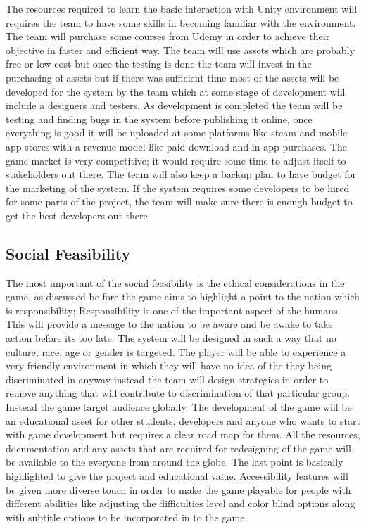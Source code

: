 The resources required to learn the basic interaction with Unity environment will requires the team to have some skills in becoming familiar with the environment. The team will purchase some courses from Udemy in order to achieve their objective in faster and efficient way.
The team will use assets which are probably free or low cost but once the testing is done the team will invest in the purchasing of assets but if there was sufficient time most of the assets will be developed for the system by the team which at some stage of development will include a designers and testers. 
As development is completed the team will be testing and finding bugs in the system before publishing it online, once everything is good it will be uploaded at some platforms like steam and mobile app stores with a revenue model like paid download and in-app purchases. The game market is very competitive; it would require some time to adjust itself to stakeholders out there. The team will also keep a backup plan to have budget for the marketing of the system. If the system requires some developers to be hired for some parts of the project, the team will make sure there is enough budget to get the best developers out there.

\subsection{Social Feasibility}

The most important of the social feasibility is the ethical considerations in the game, as discussed be-fore the game aims to highlight a point to the nation which is responsibility; Responsibility is one of the important aspect of the humans. This will provide a message to the nation to be aware and be awake to take action before its too late.
The system will be designed in such a way that no culture, race, age or gender is targeted. The player will be able to experience a very friendly environment in which they will have no idea of the they being discriminated in anyway instead the team will design strategies in order to remove anything that will contribute to discrimination of that particular group. Instead the game target audience globally.
The development of the game will be an educational asset for other students, developers and anyone who wants to start with game development but requires a clear road map for them. All the resources, documentation and any assets that are required for redesigning of the game will be available to the everyone from around the globe.
The last point is basically highlighted to give the project and educational value. 
Accessibility features will be given more diverse touch in order to make the game playable for people with different abilities like adjusting the difficulties level and color blind options along with subtitle options to be incorporated in to the game.

